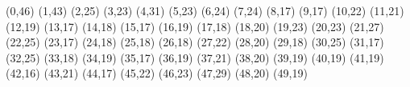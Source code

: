 (0,46)
(1,43)
(2,25)
(3,23)
(4,31)
(5,23)
(6,24)
(7,24)
(8,17)
(9,17)
(10,22)
(11,21)
(12,19)
(13,17)
(14,18)
(15,17)
(16,19)
(17,18)
(18,20)
(19,23)
(20,23)
(21,27)
(22,25)
(23,17)
(24,18)
(25,18)
(26,18)
(27,22)
(28,20)
(29,18)
(30,25)
(31,17)
(32,25)
(33,18)
(34,19)
(35,17)
(36,19)
(37,21)
(38,20)
(39,19)
(40,19)
(41,19)
(42,16)
(43,21)
(44,17)
(45,22)
(46,23)
(47,29)
(48,20)
(49,19)
